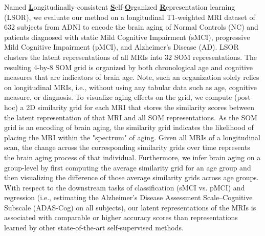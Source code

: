 \documentclass[runningheads]{llncs}
\begin{document}
Named \textbf{\underline{L}}ongitudinally-consistent \textbf{\underline{S}}elf-\textbf{\underline{O}}rganized \textbf{\underline{R}}epresentation learning \\(LSOR), %
we evaluate our method on a longitudinal T1-weighted MRI dataset of 632 subjects from ADNI to encode the brain aging of Normal Controls (NC) and patients diagnosed with static Mild Cognitive Impairment (sMCI), progressive Mild Cognitive Impairment (pMCI), and Alzheimer's Disease (AD). LSOR clusters the latent representations of all MRIs into 32 SOM representations. The resulting 4-by-8 SOM grid is organized by both chronological age and cognitive measures that are indicators of brain age. Note, such an organization solely relies on longitudinal MRIs, i.e.,  without using any tabular data such as age, cognitive measure, or diagnosis. 
To visualize aging effects on the grid, we compute (post-hoc) a 2D similarity grid for each MRI that stores the similarity scores between the latent representation of that MRI and all SOM representations. As the SOM grid is an encoding of brain aging, the similarity grid indicates the likelihood of placing the MRI within the "spectrum" of aging. Given all MRIs of a longitudinal scan, the change across the corresponding similarity grids over time represents the brain aging process of that individual. Furthermore, we infer brain aging on a group-level by first computing the average similarity grid for an age group and then visualizing the difference of those average similarity grids across age groups. %
With respect to the downstream tasks of classification (sMCI vs. pMCI)  and regression (i.e., estimating the Alzheimer’s Disease Assessment Scale–Cognitive Subscale (ADAS-Cog) on all subjects), our latent representations of the MRIs is associated with comparable or higher accuracy scores than representations learned by other state-of-the-art self-supervised methods.
\end{document}
